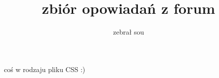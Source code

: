 \documentclass[12pt, openany, a4paper, twocolumn,landscape, twoside]{book}
\author{zebrał sou}
\title
{\small{zbiór opowiadań z forum}\\[5ex]
\Huge\textls{stalker.pl}}
\date{}
\begin{document}
coś w rodzaju pliku CSS :)
\end{document}
